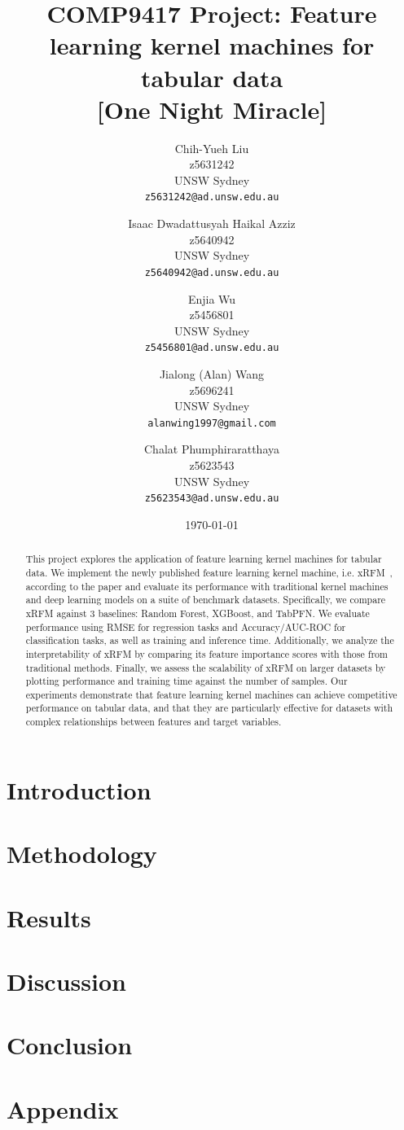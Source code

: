 \documentclass[11pt, a4paper]{article}
\title{COMP9417 Project: Feature learning kernel machines for tabular data \\ \large [One Night Miracle]}
\author{
  Chih-Yueh Liu \\
  z5631242 \\
  UNSW Sydney \\
  \texttt{z5631242@ad.unsw.edu.au}
  \and
  Isaac Dwadattusyah Haikal Azziz \\
  z5640942 \\
  UNSW Sydney \\
  \texttt{z5640942@ad.unsw.edu.au}
  \and
  Enjia Wu \\
  z5456801 \\
  UNSW Sydney \\
  \texttt{z5456801@ad.unsw.edu.au}
  \and
  Jialong (Alan) Wang \\
  z5696241 \\
  UNSW Sydney \\
  \texttt{alanwing1997@gmail.com}
  \and
  Chalat Phumphiraratthaya \\
  z5623543 \\
  UNSW Sydney \\
  \texttt{z5623543@ad.unsw.edu.au}
}
\date{\today}
\begin{document}
\maketitle
\thispagestyle{empty} %

\vspace{2cm}
\newpage
\begin{abstract}
  This project explores the application of feature learning kernel machines for tabular data. We implement the newly published feature learning kernel machine, i.e. xRFM~\cite{ref1}, according to the paper and evaluate its performance with traditional kernel machines and deep learning models on a suite of benchmark datasets. Specifically, we compare xRFM against 3 baselines: Random Forest, XGBoost, and TabPFN. We evaluate performance using RMSE for regression tasks and Accuracy/AUC-ROC for classification tasks, as well as training and inference time. Additionally, we analyze the interpretability of xRFM by comparing its feature importance scores with those from traditional methods. Finally, we assess the scalability of xRFM on larger datasets by plotting performance and training time against the number of samples. Our experiments demonstrate that feature learning kernel machines can achieve competitive performance on tabular data, and that they are particularly effective for datasets with complex relationships between features and target variables.
\end{abstract}

\section{Introduction}


\section{Methodology}


\section{Results}


\section{Discussion}


\section{Conclusion}


\newpage
\printbibliography[title={References}]

\newpage
\appendix
\section*{Appendix}




\end{document}

